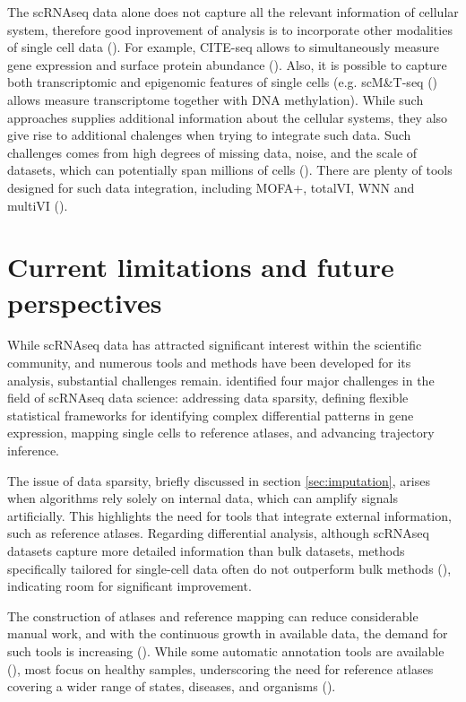 The scRNAseq data alone does not capture all the relevant information of cellular system,
therefore good inprovement of analysis is to incorporate other modalities of single cell data (\cite{Heumos2023}).
For example, CITE-seq allows to simultaneously measure gene expression and surface protein abundance (\cite{Mercatelli2021}).
Also, it is possible to capture both transcriptomic and epigenomic features of single cells
(e.g. scM\&T-seq (\cite{Angermueller2016}) allows measure transcriptome together with DNA methylation).
While such approaches supplies additional information about the cellular systems,
they also give rise to additional chalenges when trying to integrate such data.
Such challenges comes from high degrees of missing data, noise, and the scale of datasets,
which can potentially span millions of cells (\cite{Argelaguet2020}).
There are plenty of tools designed for such data integration, including MOFA+, totalVI, WNN and multiVI (\cite{Heumos2023}).

\section{Current limitations and future perspectives}

While scRNAseq data has attracted significant interest within the scientific community,
and numerous tools and methods have been developed for its analysis, substantial challenges remain.
\textcite{Lahnemann2020} identified four major challenges in the field of scRNAseq data science:
addressing data sparsity, defining flexible statistical frameworks for identifying complex differential patterns in gene expression,
mapping single cells to reference atlases, and advancing trajectory inference.

The issue of data sparsity, briefly discussed in section \ref{sec:imputation}, arises when algorithms rely solely on internal data,
which can amplify signals artificially.
This highlights the need for tools that integrate external information, such as reference atlases.
Regarding differential analysis, although scRNAseq datasets capture more detailed information than bulk datasets,
methods specifically tailored for single-cell data often do not outperform bulk methods (\cite{Soneson2017}),
indicating room for significant improvement.

The construction of atlases and reference mapping can reduce considerable manual work, and with the continuous growth in available data,
the demand for such tools is increasing (\cite{Heumos2023}).
While some automatic annotation tools are available (\cite{Dom2022}), most focus on healthy samples,
underscoring the need for reference atlases covering a wider range of states, diseases, and organisms (\cite{Heumos2023}).

